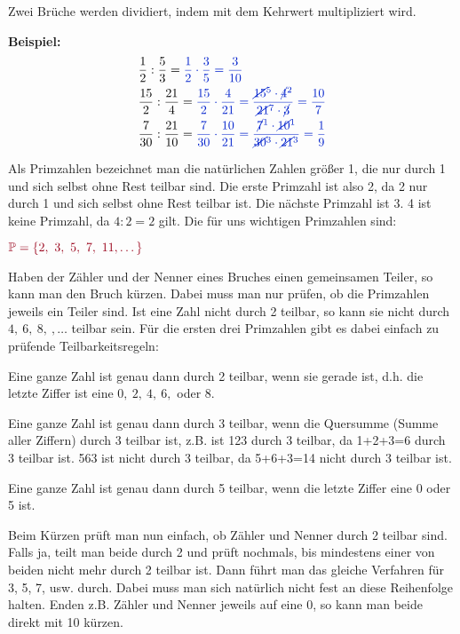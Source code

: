 \begin{tcolorbox}
	Zwei Brüche werden dividiert, indem mit dem Kehrwert multipliziert wird.
\end{tcolorbox}

\textbf{Beispiel:}
\begin{align*}
	&\frac{1}{2}:\frac{5}{3}=\textcolor{loes}{\frac{1}{2}\cdot\frac{3}{5}=\frac{3}{10}}\\
	&\frac{15}{2}:\frac{21}{4}=\textcolor{loes}{\frac{15}{2}\cdot\frac{4}{21}=\frac{\cancel{15}^5\cdot\cancel{4}^2}{\cancel{21}^7\cdot \cancel{3}}=\frac{10}{7}}\\
	&\frac{7}{30}:\frac{21}{10}=\textcolor{loes}{\frac{7}{30}\cdot\frac{10}{21}=\frac{\cancel{7}^1\cdot\cancel{10}^1}{\cancel{30}^3\cdot\cancel{21}^3}=\frac{1}{9}}
\end{align*}

\newpage
Als Primzahlen bezeichnet man die natürlichen Zahlen größer 1, die nur durch 1 und sich selbst ohne Rest teilbar sind. Die erste Primzahl ist also 2, da 2 nur durch 1 und sich selbst ohne Rest teilbar ist. Die nächste Primzahl ist 3. 4 ist keine Primzahl, da \(4:2=2\) gilt. Die für uns wichtigen Primzahlen sind:
\begin{tcolorbox}\centering
	\(\textcolor{loestc}{\mathbb{P}=\{2,\ 3,\ 5,\ 7,\ 11,\dots\}}\)
\end{tcolorbox}
Haben der Zähler und der Nenner eines Bruches einen gemeinsamen Teiler, so kann man den Bruch kürzen. Dabei muss man nur prüfen, ob die Primzahlen jeweils ein Teiler sind. Ist eine Zahl nicht durch 2 teilbar, so kann sie nicht durch \(4,\ 6,\ 8,\ ,\dots\) teilbar sein. Für die ersten drei Primzahlen gibt es dabei einfach zu prüfende Teilbarkeitsregeln:
\begin{tcolorbox}\centering
	\textcolor{loestc}{Eine ganze Zahl ist genau dann durch 2 teilbar, wenn sie gerade ist, d.h. die letzte Ziffer ist eine \(0,\ 2,\ 4,\ 6,\) oder  \(8\).}
\end{tcolorbox}
\begin{tcolorbox}\centering
	\textcolor{loestc}{Eine ganze Zahl ist genau dann durch 3 teilbar, wenn die Quersumme (Summe aller Ziffern) durch 3 teilbar ist, z.B. ist 123 durch 3 teilbar, da 1+2+3=6 durch 3 teilbar ist. 563 ist nicht durch 3 teilbar, da 5+6+3=14 nicht durch 3 teilbar ist.}
\end{tcolorbox}
\begin{tcolorbox}\centering
	\textcolor{loestc}{Eine ganze Zahl ist genau dann durch 5 teilbar, wenn die letzte Ziffer eine 0 oder 5 ist.}
\end{tcolorbox}
Beim Kürzen prüft man nun einfach, ob Zähler und Nenner durch 2 teilbar sind. Falls ja, teilt man beide durch 2 und prüft nochmals, bis mindestens einer von beiden nicht mehr durch 2 teilbar ist. Dann führt man das gleiche Verfahren für 3, 5, 7, usw. durch. Dabei muss man sich natürlich nicht fest an diese Reihenfolge halten. Enden z.B. Zähler und Nenner jeweils auf eine 0, so kann man beide direkt mit 10 kürzen.

